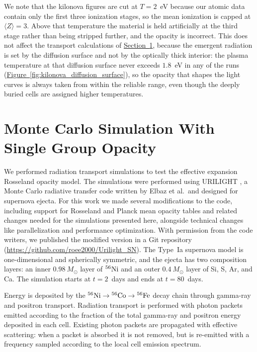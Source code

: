 \documentclass[final,5p,times,twocolumn]{elsarticle}
\DeclareRobustCommand{\secref}[1]{\hyperref[#1]{Section~\ref*{#1}}}
\DeclareRobustCommand{\figref}[1]{\hyperref[#1]{Figure~\ref*{#1}}}
\begin{document}
    We note that the kilonova figures are cut at $T=2$~eV because our atomic data contain only the first three
    ionization stages, so the mean ionization is capped at $\langle Z\rangle=3$. Above that 
    temperature the material is held artificially at the third stage rather than being stripped
    further, and the opacity is incorrect. This does not affect the transport calculations of
    \secref{SecRadiationSimulations}, because the emergent radiation is set by the diffusion
    surface and not by the optically thick interior: the plasma temperature at that diffusion surface never
    exceeds $1.8$~eV in any of the runs (\figref{fig:kilonova_diffusion_surface}),
    so the opacity that shapes the light curves is always
    taken from within the reliable range, even though the deeply buried cells are assigned
    higher temperatures.


\section{Monte Carlo Simulation With Single Group Opacity}
\label{SecRadiationSimulations}

    We performed radiation transport simulations to test the effective expansion Rosseland opacity model.
    The simulations were performed using URILIGHT \cite{urilightCode,urilight1,urilight2}, a Monte Carlo
    radiative transfer code written by Elbaz et al.\ and designed for supernova ejecta.
    For this work we made several modifications to the code, including support for
    Rosseland and Planck mean opacity tables and related changes needed for the simulations
    presented here, alongside technical changes like parallelization and performance optimization.
    With permission from the code writers, we published the modified version in a Git
    repository (\url{https://github.com/roee2000/Urilight_SN}).
    The Type~Ia supernova model is one-dimensional and spherically
    symmetric, and the ejecta has two composition layers: an inner
    $0.98~M_\odot$ layer of $^{56}{\rm Ni}$ and an outer $0.4~M_\odot$ layer of Si, S, Ar, and Ca.
    The simulation starts at $t=2$~days and ends at $t=80$~days.

    Energy is deposited by the $^{56}{\rm Ni}\rightarrow{}^{56}{\rm Co}\rightarrow{}^{56}{\rm Fe}$
    decay chain through gamma-ray and positron transport. Radiation transport is performed with
    photon packets emitted according to the fraction of the total gamma-ray and positron energy
    deposited in each cell. Existing photon packets are propagated with effective scattering: when a
    packet is absorbed it is not removed, but is re-emitted with a frequency sampled according to the local cell
    emission spectrum.
\end{document}
